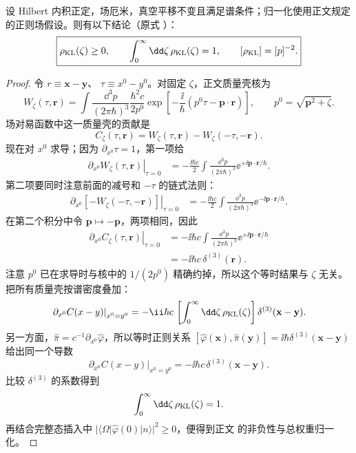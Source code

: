 \begin{proposition}[谱测度的正性与归一化]
设 Hilbert 内积正定，场厄米，真空平移不变且满足谱条件；归一化使用正文规定的正则场假设。则有以下结论（原式 ）：
\begin{equation*}
 \boxed{
 \rho_{\rm KL}(\zeta)\ge0,
 \qquad
 \int_0^\infty\dd\zeta\,\rho_{\rm KL}(\zeta)=1,
 \qquad [\rho_{\rm KL}]=[p]^{-2}.}
\end{equation*}
\end{proposition}
\begin{proof}
令 $r\equiv\mathbf x-\mathbf y$、
$\tau\equiv x^0-y^0$。对固定 $\zeta$，正文质量壳核为
\begin{equation*}
 W_\zeta(\tau,\mathbf r)
 =\int\frac{\dd^3p}{(2\pi\hbar)^3}
 \frac{\hbar^2c}{2p^0}
 \exp\!\left[-\frac{\ii}{\hbar}
 (p^0\tau-\mathbf p\cdot\mathbf r)\right],
 \qquad p^0=\sqrt{\mathbf p^2+\zeta}.
\end{equation*}
场对易函数中这一质量壳的贡献是
\[
 C_\zeta(\tau,\mathbf r)
 =W_\zeta(\tau,\mathbf r)-W_\zeta(-\tau,-\mathbf r).
\]
现在对 $x^0$ 求导；因为 $\partial_{x^0}\tau=1$，第一项给
\begin{align*}
 \left.\partial_{x^0}W_\zeta(\tau,\mathbf r)\right|_{\tau=0}
 &=-\frac{\ii\hbar c}{2}
 \int\frac{\dd^3p}{(2\pi\hbar)^3}
 \ee^{+\ii\mathbf p\cdot\mathbf r/\hbar}.
\end{align*}
第二项要同时注意前面的减号和 $-\tau$ 的链式法则：
\begin{align*}
 \left.\partial_{x^0}[-W_\zeta(-\tau,-\mathbf r)]\right|_{\tau=0}
 &=-\frac{\ii\hbar c}{2}
 \int\frac{\dd^3p}{(2\pi\hbar)^3}
 \ee^{-\ii\mathbf p\cdot\mathbf r/\hbar}.
\end{align*}
在第二个积分中令 $\mathbf p\mapsto-\mathbf p$，两项相同，因此
\begin{align*}
 \left.\partial_{x^0}C_\zeta(\tau,\mathbf r)\right|_{\tau=0}
 &=-\ii\hbar c
 \int\frac{\dd^3p}{(2\pi\hbar)^3}
 \ee^{+\ii\mathbf p\cdot\mathbf r/\hbar}\\
 &=-\ii\hbar c\,\delta^{(3)}(\mathbf r).
\end{align*}
注意 $p^0$ 已在求导时与核中的 $1/(2p^0)$ 精确约掉，所以这个等时结果与 $\zeta$ 无关。把所有质量壳按谱密度叠加：
\begin{align*}
 \left.\partial_{x^0}C(x-y)\right|_{x^0=y^0}
 =-\ii\hbar c\,
 \left[\int_0^\infty\dd\zeta\,\rho_{\rm KL}(\zeta)\right]
 \delta^{(3)}(\mathbf x-\mathbf y).
\end{align*}
另一方面，$\hat\pi=c^{-1}\partial_{x^0}\hat\varphi$，所以等时正则关系
$[\hat\varphi(\mathbf x),\hat\pi(\mathbf y)]=\ii\hbar\delta^{(3)}(\mathbf x-\mathbf y)$
给出同一个导数
\[
 \left.\partial_{x^0}C(x-y)\right|_{x^0=y^0}
 =-\ii\hbar c\,\delta^{(3)}(\mathbf x-\mathbf y).
\]
比较 $\delta^{(3)}$ 的系数得到
\[
 \int_0^\infty\dd\zeta\,\rho_{\rm KL}(\zeta)=1.
\]
再结合完整态插入中
$|\langle\Omega|\hat\varphi(0)|n\rangle|^2\ge0$，便得到正文
 的非负性与总权重归一化。
\end{proof}

